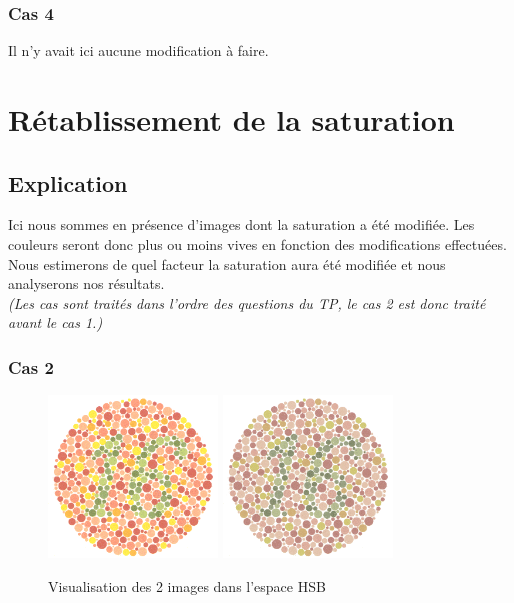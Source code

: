 \documentclass[a4paper]{article}
\begin{document}
\subsubsection{Cas 4}
Il n'y avait ici aucune modification à faire.

\clearpage

\section{Rétablissement de la saturation}

\subsection{Explication}

Ici nous sommes en présence d'images dont la saturation a été modifiée. Les couleurs seront donc plus ou moins vives en fonction des modifications effectuées.\\
Nous estimerons de quel facteur la saturation aura été modifiée et nous analyserons nos résultats.\\
{\em (Les cas sont traités dans l'ordre des questions du TP, le cas 2 est donc traité avant le cas 1.)}

\subsubsection{Cas 2}

\begin{figure}[H]
\begin{center}
\includegraphics[width=170px]{../base/cas_2_dalton16.png}
\includegraphics[width=170px]{../base/cas_2_dalton16-question2-1.png}
\end{center}
\caption{Visualisation des 2 images dans l'espace HSB}
\end{figure}
\end{document}
